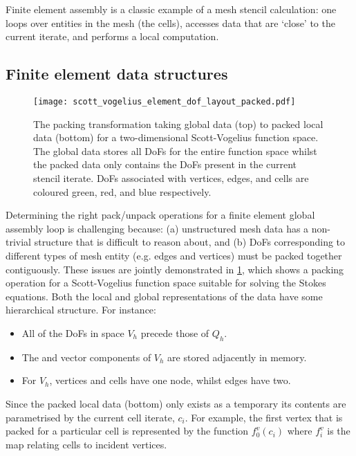 \documentclass[thesis]{subfiles}
\begin{document}
Finite element assembly is a classic example of a mesh stencil calculation: one loops over entities in the mesh (the cells), accesses data that are `close' to the current iterate, and performs a local computation.

\subsection{Finite element data structures}

\begin{figure}
  \centering
  \texttt{[image: scott\_vogelius\_element\_dof\_layout\_packed.pdf]}
  \caption{
    The packing transformation taking global data (top) to packed local data (bottom) for a two-dimensional Scott-Vogelius function space.
    The global data stores all DoFs for the entire function space whilst the packed data only contains the DoFs present in the current stencil iterate.
    DoFs associated with vertices, edges, and cells are coloured green, red, and blue respectively.
  }
  \label{fig:scott_vogelius_element_dof_layout_packed}
\end{figure}

Determining the right pack/unpack operations for a finite element global assembly loop is challenging because:
(a) unstructured mesh data has a non-trivial structure that is difficult to reason about, and
(b) DoFs corresponding to different types of mesh entity (e.g. edges and vertices) must be packed together contiguously.
These issues are jointly demonstrated in \cref{fig:scott_vogelius_element_dof_layout_packed}, which shows a packing operation for a Scott-Vogelius function space suitable for solving the Stokes equations.
Both the local and global representations of the data have some hierarchical structure.
For instance:
\begin{itemize}
  \item All of the DoFs in space $V_h$ precede those of $Q_h$.
  \item The  and  vector components of $V_h$ are stored adjacently in memory.
  \item For $V_h$, vertices and cells have one node, whilst edges have two.
\end{itemize}
Since the packed local data (bottom) only exists as a temporary its contents are parametrised by the current cell iterate, $c_i$.
For example, the first vertex that is packed for a particular cell is represented by the function $f^v_0(c_i)$ where $f^v_i$ is the map relating cells to incident vertices.
\end{document}
